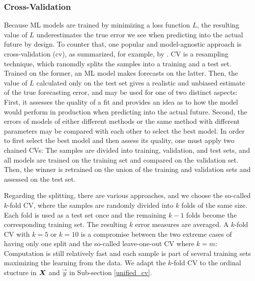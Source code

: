 \subsubsection{Cross-Validation}
\label{cv}

Because ML models are trained by minimizing a loss function $L$, the
    resulting value of $L$ underestimates the true error we see when
    predicting into the actual future by design.
To counter that, one popular and model-agnostic approach is cross-validation
    (\gls{cv}), as summarized, for example, by \cite{hastie2013}.
CV is a resampling technique, which ranomdly splits the samples into a
    training and a test set.
Trained on the former, an ML model makes forecasts on the latter.
Then, the value of $L$ calculated only on the test set gives a realistic and
    unbiased estimate of the true forecasting error, and may be used for one
    of two distinct aspects:
First, it assesses the quality of a fit and provides an idea as to how the
    model would perform in production when predicting into the actual future.
Second, the errors of models of either different methods or the same method
    with different parameters may be compared with each other to select the
    best model.
In order to first select the best model and then assess its quality, one must
    apply two chained CVs:
The samples are divided into training, validation, and test sets, and all
    models are trained on the training set and compared on the validation set.
Then, the winner is retrained on the union of the training and validation
    sets and assessed on the test set.

Regarding the splitting, there are various approaches, and we choose the
    so-called $k$-fold CV, where the samples are randomly divided into $k$
    folds of the same size.
Each fold is used as a test set once and the remaining $k-1$ folds become
    the corresponding training set.
The resulting $k$ error measures are averaged.
A $k$-fold CV with $k=5$ or $k=10$ is a compromise between the two extreme
    cases of having only one split and the so-called leave-one-out CV
    where $k = m$: Computation is still relatively fast and each sample is
    part of several training sets maximizing the learning from the data.
We adapt the $k$-fold CV to the ordinal stucture in $\bm{X}$ and $\vec{y}$ in
    Sub-section \ref{unified_cv}.
